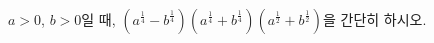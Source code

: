 $a>0$, $b>0$일 때, $(a^{\frac{1}{4}}-b^{\frac{1}{4}})(a^{\frac{1}{4}}+b^{\frac{1}{4}})(a^{\frac{1}{2}}+b^{\frac{1}{2}})$을 간단히 하시오.
